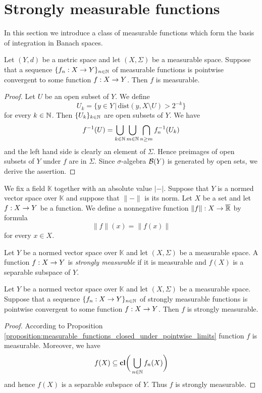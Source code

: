 \section{Strongly measurable functions}
\noindent
In this section we introduce a class of measurable functions which form the basis of integration in Banach spaces.

\begin{proposition}\label{proposition:measurable_functions_closed_under_pointwise_limits}
Let $(Y,d)$ be a metric space and let $(X,\Sigma)$ be a measurable space. Suppose that a sequence $\{f_n:X\rightarrow Y\}_{n\in {\mathbb N}}$ of measurable functions is pointwise convergent to some function $f:X\rightarrow Y$. Then $f$ is measurable.
\end{proposition}
\begin{proof}
Let $U$ be an open subset of $Y$. We define
$$U_k = \big\{y \in Y\,\big|\,\mathrm{dist}\left(y,X\setminus U\right) > 2^{-k}\big\}$$
for every $k\in {\mathbb N}$. Then $\{U_k\}_{k\in {\mathbb N}}$ are open subsets of $Y$. We have
$$f^{-1}(U) =\bigcup_{k\in {\mathbb N}}\bigcup_{m\in {\mathbb N}}\bigcap_{n\geq m}f_n^{-1}(U_k)$$
and the left hand side is clearly an element of $\Sigma$. Hence preimages of open subsets of $Y$ under $f$ are in $\Sigma$. Since $\sigma$-algebra ${\mathcal B}(Y)$ is generated by open sets, we derive the assertion.
\end{proof}
\noindent
We fix a field $\mathbb{K}$ together with an absolute value $|-|$. Suppose that $Y$ is a normed vector space over $\mathbb{K}$ and suppose that $\lVert-\rVert$ is its norm. Let $X$ be a set and let $f:X\rightarrow Y$ be a function. We define a nonnegative function $\lVert f \rVert:X\rightarrow \overline{{\mathbb R}}$ by formula 
$$\lVert f\rVert (x) = \lVert f(x) \rVert$$
for every $x\in X$.

\begin{definition}
Let $Y$ be a normed vector space over $\mathbb{K}$ and let $(X,\Sigma)$ be a measurable space. A function $f:X\rightarrow Y$ is \textit{strongly measurable} if it is measurable and $f(X)$ is a separable subspace of $Y$.
\end{definition}

\begin{proposition}\label{proposition:strongly_measurable_functions_closed_under_pointwise_limits}
Let $Y$ be a normed vector space over $\mathbb{K}$ and let $(X,\Sigma)$ be a measurable space. Suppose that a sequence $\{f_n:X\rightarrow Y\}_{n\in {\mathbb N}}$ of strongly measurable functions is pointwise convergent to some function $f:X\rightarrow Y$. Then $f$ is strongly measurable.
\end{proposition}
\begin{proof}
According to Proposition \ref{proposition:measurable_functions_closed_under_pointwise_limits} function $f$ is measurable. Moreover, we have
$$f(X) \subseteq \mathbf{cl}\bigg(\bigcup_{n\in {\mathbb N}}f_n(X)\bigg)$$
and hence $f(X)$ is a separable subspace of $Y$. Thus $f$ is strongly measurable.
\end{proof}

